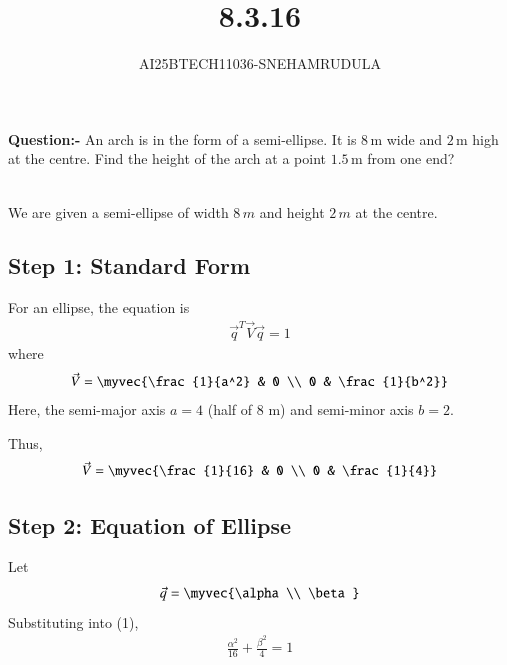 \documentclass[journal]{IEEEtran}
\begin{document}

\vspace{3cm}

\title{8.3.16}
\author{AI25BTECH11036-SNEHAMRUDULA}
 \maketitle
{\let\newpage\relax\maketitle}
\renewcommand{\thefigure}{\theenumi}
\renewcommand{\thetable}{\theenumi}
\setlength{\intextsep}{10pt} 
\renewcommand{\thetable}{\theenumi}
\textbf{Question:-}\;
An arch is in the form of a semi-ellipse. It is $8 \, \text{m}$ wide and $2 \, \text{m}$ high at the centre. Find the height of the arch at a point $1.5 \, \text{m}$ from one end?

\solution \\

We are given a semi-ellipse of width $8\,m$ and height $2\,m$ at the centre.
\subsection*{Step 1: Standard Form}
For an ellipse, the equation is
\begin{align}
\vec{q}^T\vec{V}\vec{q} = 1
\end{align}
where
\begin{align}
\vec{V} = \myvec{\frac{1}{a^2} & 0 \\ 0 & \frac{1}{b^2}}
\end{align}
Here, the semi-major axis $a = 4$ (half of 8 m) and semi-minor axis $b = 2$.

Thus,
\begin{align}
\vec{V} = \myvec{\frac{1}{16} & 0 \\ 0 & \frac{1}{4}}
\end{align}

\subsection*{Step 2: Equation of Ellipse}
Let 
\begin{align}
\vec{q} = \myvec{\alpha \\ \beta}
\end{align}
Substituting into (1),
\begin{align}
\frac{\alpha^2}{16} + \frac{\beta^2}{4} = 1
\end{align}
\end{document}
